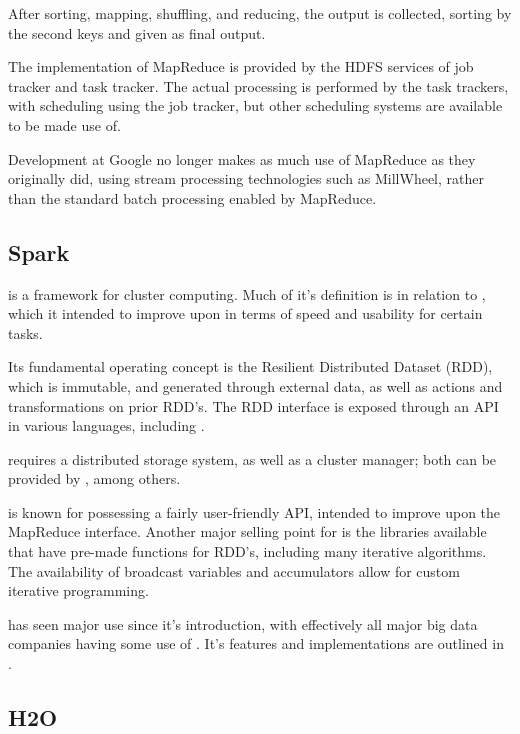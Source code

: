 After sorting, mapping, shuffling, and reducing, the output is
collected, sorting by the second keys and given as final output.

The implementation of MapReduce is provided by the HDFS services of job
tracker and task tracker. The actual processing is performed by the task
trackers, with scheduling using the job tracker, but other scheduling
systems are available to be made use of.

Development at Google no longer makes as much use of MapReduce as they
originally did, using stream processing technologies such as MillWheel,
rather than the standard batch processing enabled by
MapReduce\cite{akidau2013millwheel}.

\subsection{Spark}\label{sec:spark}

 is a framework for cluster computing\cite{zaharia2010spark}. Much
of it's definition is in relation to , which it intended to
improve upon in terms of speed and usability for certain tasks.

Its fundamental operating concept is the Resilient Distributed Dataset
(RDD), which is immutable, and generated through external data, as well
as actions and transformations on prior RDD's. The RDD interface is
exposed through an API in various languages, including \R{}.

 requires a distributed storage system, as well as a cluster
manager; both can be provided by , among others.

 is known for possessing a fairly user-friendly API, intended to
improve upon the MapReduce interface. Another major selling point for
 is the libraries available that have pre-made functions for RDD's,
including many iterative algorithms. The availability of broadcast
variables and accumulators allow for custom iterative programming.

 has seen major use since it's introduction, with effectively all
major big data companies having some use of . It's features and
implementations are outlined in \textcite{zaharia2016apache}.

\subsection{H2O}\label{sec:h2o}

